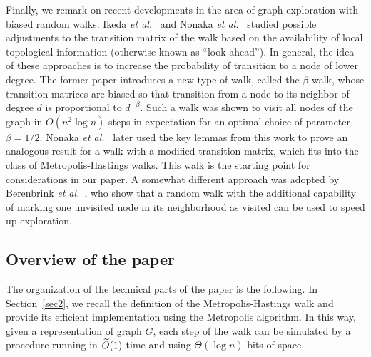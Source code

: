 \documentclass[11pt,a4paper]{article}
\newcommand{\etal}{\textsl{et al.}\xspace}
\renewcommand{\O}{\ensuremath \widetilde O}
\renewcommand{\*}{\hspace*{5mm}}
\begin{document}
Finally, we remark on recent developments in the area of graph exploration with biased random walks. Ikeda \etal~\cite{IKY} and Nonaka \etal~\cite{NOSY} studied possible adjustments to the transition matrix of the walk based on the availability of local topological information (otherwise known as ``look-ahead''). In general, the idea of these approaches is to increase the probability of transition to a node of lower degree. The former paper introduces a new type of walk, called the $\beta$-walk, whose transition matrices are biased so that transition from a node to its neighbor of degree $d$ is proportional to $d^{-\beta}$. Such a walk was shown to visit all nodes of the graph in $O(n^2 \log n)$ steps in expectation for an optimal choice of parameter $\beta = 1/2$. Nonaka \etal~\cite{NOSY} later used the key lemmas from this work to prove an analogous result for a walk with a modified transition matrix, which fits into the class of Metropolis-Hastings walks. This walk is the starting point for considerations in our paper. A somewhat different approach was adopted by Berenbrink \etal~\cite{BCERS}, who show that a random walk with the additional capability of marking one unvisited node in its neighborhood as visited can be used to speed up exploration.

\subsection{Overview of the paper}

The organization of the technical parts of the paper is the following. In Section~\ref{sec2}, we recall the definition of the Metropolis-Hastings walk and provide its efficient implementation using the Metropolis algorithm. In this way, given a representation of graph $G$, each step of the walk can be simulated by a procedure running in $\O(1)$ time and using $\Theta (\log n)$ bits of space.
\end{document}
